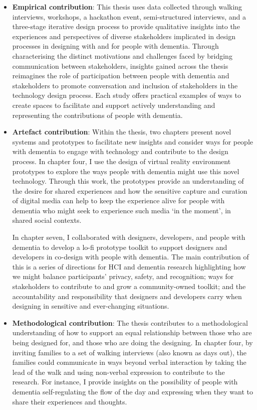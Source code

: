 \begin{itemize}
    \item \textbf{Empirical contribution}: This thesis uses data collected through walking interviews, workshops, a hackathon event, semi-structured interviews, and a three-stage iterative design process to provide qualitative insights into the experiences and perspectives of diverse stakeholders implicated in design processes in designing with and for people with dementia. Through characterising the distinct motivations and challenges faced by bridging communication between stakeholders, insights gained across the thesis reimagines the role of participation between people with dementia and stakeholders to promote conversation and inclusion of stakeholders in the technology design process. Each study offers practical examples of ways to create spaces to facilitate and support actively understanding and representing the contributions of people with dementia. 

    
    \item \textbf{Artefact contribution}: Within the thesis, two chapters present novel systems and prototypes to facilitate new insights and consider ways for people with dementia to engage with technology and contribute to the design process. In chapter four, I use the design of virtual reality environment prototypes to explore the ways people with dementia might use this novel technology. Through this work, the prototypes provide an understanding of the desire for shared experiences and how the sensitive capture and curation of digital media can help to keep the experience alive for people with dementia who might seek to experience such media `in the moment', in shared social contexts.
    
    In chapter seven, I collaborated with designers, developers, and people with dementia to develop a lo-fi prototype toolkit to support designers and developers in co-design with people with dementia. The main contribution of this is a series of directions for HCI and dementia research highlighting how we might balance participants’ privacy, safety, and recognition; ways for stakeholders to contribute to and grow a community-owned toolkit; and the accountability and responsibility that designers and developers carry when designing in sensitive and ever-changing situations.

    
    \item \textbf{Methodological contribution}:  The thesis contributes to a methodological understanding of how to support an equal relationship between those who are being designed for, and those who are doing the designing. In chapter four, by inviting families to a set of walking interviews (also known as days out), the families could communicate in ways beyond verbal interaction by taking the lead of the walk and using non-verbal expression to contribute to the research. For instance, I provide insights on the possibility of people with dementia self-regulating the flow of the day and expressing when they want to share their experiences and thoughts.


\end{itemize}
